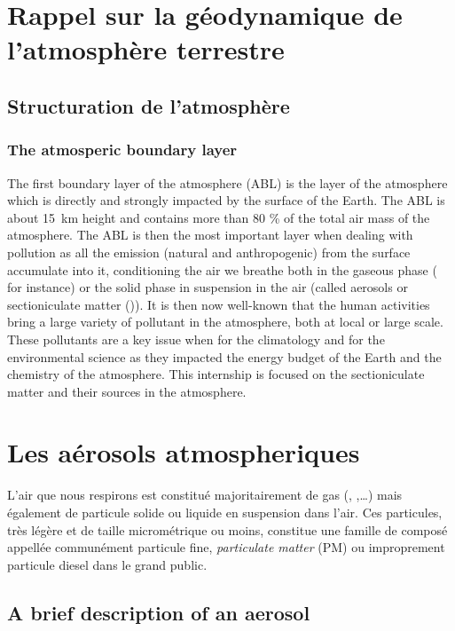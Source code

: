 
\section{Rappel sur la géodynamique de l'atmosphère terrestre}%
\label{sec:structure_atmosphere}

\subsection{Structuration de l'atmosphère}%
\label{sub:structuration_de_l_atmosphere}


\subsubsection{The atmosperic boundary layer}%
\label{sub:the_atmosperic_boundary_layer}
The first boundary layer of the atmosphere (ABL) is the layer of the atmosphere
which is directly and strongly impacted by the surface of the Earth. The ABL is
about \SI{15}{\kilo\m} height and contains more than 80 \% of the total air mass of
the atmosphere.  The ABL is then the most important layer when dealing with
pollution as all the emission (natural and anthropogenic) from the surface
accumulate into it, conditioning the air we breathe both in the gaseous phase
( for instance) or the solid phase in suspension in the air (called
aerosols or sectioniculate matter (\PM)).  It is then now well-known that the human
activities bring a large variety of pollutant in the atmosphere, both at local
or large scale.  These pollutants are a key issue when for the climatology and
for the environmental science as they impacted the energy budget of the Earth
and the chemistry of the atmosphere.  This internship is focused on the
sectioniculate matter and their sources in the atmosphere. 
\section{Les aérosols atmospheriques}%
\label{sec:les_aerosols_atmosphereiques}

L'air que nous respirons est constitué majoritairement de gas (, ,…) mais
également de particule solide ou liquide en suspension dans l'air. Ces particules, très
légère et de taille micrométrique ou moins, constitue une famille de composé appellée
communément particule fine, \textit{particulate matter} (PM) ou improprement particule
diesel dans le grand public.


\subsection{A brief description of an aerosol}%
\label{sub:a_brief_description_of_an_aerosol}

